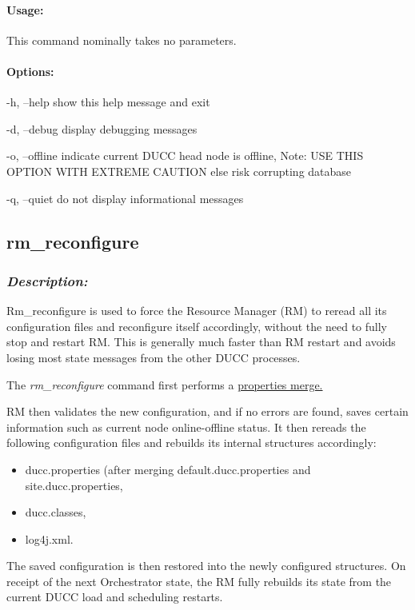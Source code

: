     \paragraph{Usage:}
        This command nominally takes no parameters.
        
    \paragraph{Options:}
    \begin{description}
      	\item -h, --help     show this help message and exit
      	\item -d, --debug    display debugging messages
      	\item -o, --offline  indicate current DUCC head node is offline, Note: USE THIS OPTION WITH EXTREME CAUTION else risk corrupting database
      	\item -q, --quiet    do not display informational messages
    \end{description}


\subsection{rm\_reconfigure}
\label{subsec:admin.rm-reconfigure}

    \subsubsection{{\em Description:}}
    Rm\_reconfigure is used to force the Resource Manager (RM) to reread all its configuration
    files and reconfigure itself accordingly, without the need to fully stop and restart RM.
    This is generally much faster than RM restart and avoids losing most state messages from
    the other DUCC processes.
    
    The {\em rm\_reconfigure} command first performs a 
    \hyperref[sec:admin.properties-merge]{properties merge.}

    RM then validates the new
    configuration, and if no errors are found, saves certain information such as current node
    online-offline status.  It then rereads the following configuration files and rebuilds its
    internal structures accordingly:
    \begin{itemize}
      \item ducc.properties (after merging default.ducc.properties and site.ducc.properties,
      \item ducc.classes,
      \item log4j.xml.
    \end{itemize}
    The saved configuration is then restored into the newly configured structures.
    On receipt of the next Orchestrator state, the RM fully rebuilds its state from the current
    DUCC load and scheduling restarts.

